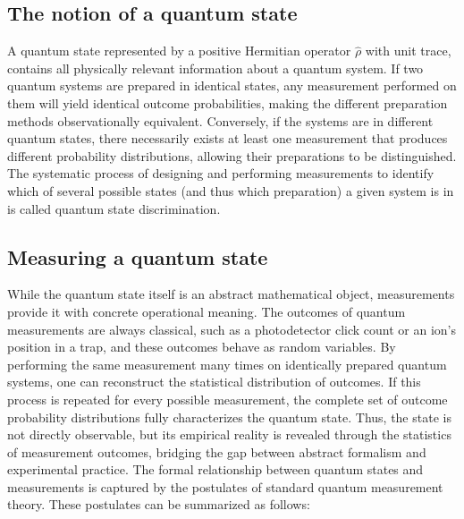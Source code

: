 \subsection{The notion of a quantum state}

A quantum state represented by a positive Hermitian operator $\hat{\rho}$ with unit trace, contains all physically relevant information about a quantum system. If two quantum systems are prepared in identical states, any measurement performed on them will yield identical outcome probabilities, making the different preparation methods observationally equivalent. Conversely, if the systems are in different quantum states, there necessarily exists at least one measurement that produces different probability distributions, allowing their preparations to be distinguished. The systematic process of designing and performing measurements to identify which of several possible states (and thus which preparation) a given system is in is called quantum state discrimination. 

\subsection{Measuring a quantum state}

While the quantum state itself is an abstract mathematical object, measurements provide it with concrete operational meaning. The outcomes of quantum measurements are always classical, such as a photodetector click count or an ion’s position in a trap, and these outcomes behave as random variables. By performing the same measurement many times on identically prepared quantum systems, one can reconstruct the statistical distribution of outcomes. If this process is repeated for every possible measurement, the complete set of outcome probability distributions fully characterizes the quantum state. Thus, the state is not directly observable, but its empirical reality is revealed through the statistics of measurement outcomes, bridging the gap between abstract formalism and experimental practice. The formal relationship between quantum states and measurements is captured by the postulates of standard quantum measurement theory. These postulates can be summarized as follows:

